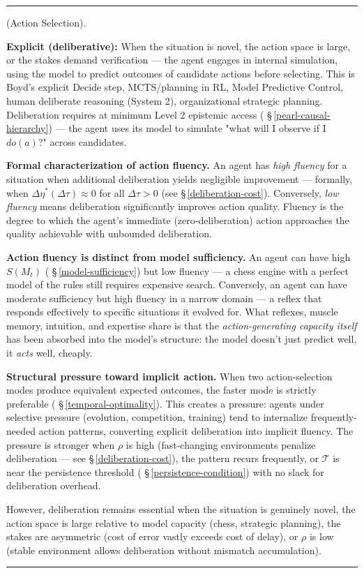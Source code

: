 \documentclass[11pt,oneside]{article}
\newcounter{claim}[section]
\renewcommand{\theclaim}{\thesection.\arabic{claim}}
\newenvironment{segment}[2]{%
  \refstepcounter{claim}%
  \bigskip\noindent\hrule\smallskip
  \noindent{\bfseries #1~\theclaim}\enskip(#2).\par\smallskip
  \noindent\ignorespaces
}{%
  \par\smallskip\noindent\hrule\bigskip
}
\newenvironment{proposition}[1][]{\begin{segment}{Proposition}{#1}}{\end{segment}}
\begin{document}
\begin{proposition}[Action Selection]
\textbf{Explicit (deliberative):} When the situation is novel, the action space is large, or the stakes demand verification — the agent engages in internal simulation, using the model to predict outcomes of candidate actions before selecting. This is Boyd's explicit Decide step, MCTS/planning in RL, Model Predictive Control, human deliberate reasoning (System 2), organizational strategic planning. Deliberation requires at minimum Level 2 epistemic access ( \S\,\ref{pearl-causal-hierarchy}) — the agent uses its model to simulate "what will I observe if I $do(a)$?" across candidates.

\textbf{Formal characterization of action fluency.} An agent has \textit{high fluency} for a situation when additional deliberation yields negligible improvement — formally, when $\Delta\eta^*(\Delta\tau) \approx 0$ for all $\Delta\tau > 0$ (see \S\,\ref{deliberation-cost}). Conversely, \textit{low fluency} means deliberation significantly improves action quality. Fluency is the degree to which the agent's immediate (zero-deliberation) action approaches the quality achievable with unbounded deliberation.

\textbf{Action fluency is distinct from model sufficiency.} An agent can have high $S(M_t)$ ( \S\,\ref{model-sufficiency}) but low fluency — a chess engine with a perfect model of the rules still requires expensive search. Conversely, an agent can have moderate sufficiency but high fluency in a narrow domain — a reflex that responds effectively to specific situations it evolved for. What reflexes, muscle memory, intuition, and expertise share is that the \textit{action-generating capacity itself} has been absorbed into the model's structure: the model doesn't just predict well, it \textit{acts} well, cheaply.

\textbf{Structural pressure toward implicit action.} When two action-selection modes produce equivalent expected outcomes, the faster mode is strictly preferable ( \S\,\ref{temporal-optimality}). This creates a pressure: agents under selective pressure (evolution, competition, training) tend to internalize frequently-needed action patterns, converting explicit deliberation into implicit fluency. The pressure is stronger when $\rho$ is high (fast-changing environments penalize deliberation — see \S\,\ref{deliberation-cost}), the pattern recurs frequently, or $\mathcal{T}$ is near the persistence threshold ( \S\,\ref{persistence-condition}) with no slack for deliberation overhead.

However, deliberation remains essential when the situation is genuinely novel, the action space is large relative to model capacity (chess, strategic planning), the stakes are asymmetric (cost of error vastly exceeds cost of delay), or $\rho$ is low (stable environment allows deliberation without mismatch accumulation).


\end{proposition}
\end{document}
